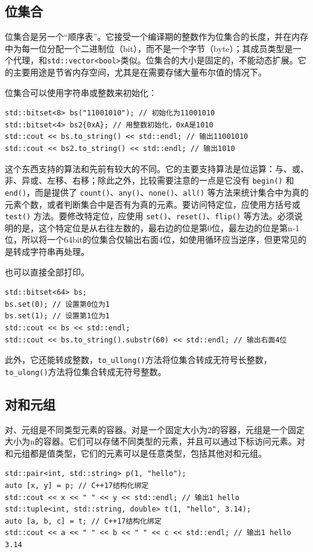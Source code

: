 \subsection{位集合}

位集合是另一个“顺序表”。它接受一个编译期的整数作为位集合的长度，并在内存中为每一位分配一个二进制位（bit），而不是一个字节（byte）；其成员类型是一个代理，和\verb|std::vector<bool>|类似。位集合的大小是固定的，不能动态扩展。它的主要用途是节省内存空间，尤其是在需要存储大量布尔值的情况下。

位集合可以使用字符串或整数来初始化：
\begin{verbatim}
std::bitset<8> bs("11001010"); // 初始化为11001010
std::bitset<4> bs2{0xA}; // 用整数初始化，0xA是1010
std::cout << bs.to_string() << std::endl; // 输出11001010
std::cout << bs2.to_string() << std::endl; // 输出1010
\end{verbatim}

这个东西支持的算法和先前有较大的不同。它的主要支持算法是位运算：与、或、非、异或、左移、右移；除此之外，比较需要注意的一点是它没有 \verb|begin()| 和 \verb|end()|，而是提供了 \verb|count()|、\verb|any()|、\verb|none()|、\verb|all()| 等方法来统计集合中为真的元素个数，或者判断集合中是否有为真的元素。要访问特定位，应使用方括号或 \verb|test()| 方法。要修改特定位，应使用 \verb|set()|、\verb|reset()|、\verb|flip()| 等方法。必须说明的是，这个特定位是从右往左数的，最右边的位是第0位，最左边的位是第n-1位，所以将一个64bit的位集合仅输出右面4位，如使用循环应当逆序，但更常见的是转成字符串再处理。

也可以直接全部打印。
\begin{verbatim}
std::bitset<64> bs;
bs.set(0); // 设置第0位为1
bs.set(1); // 设置第1位为1
std::cout << bs << std::endl; 
std::cout << bs.to_string().substr(60) << std::endl; // 输出右面4位
\end{verbatim}

此外，它还能转成整数，\verb|to_ullong()|方法将位集合转成无符号长整数，\verb|to_ulong()|方法将位集合转成无符号整数。

\subsection{对和元组}

对、元组是不同类型元素的容器。对是一个固定大小为2的容器，元组是一个固定大小为n的容器。它们可以存储不同类型的元素，并且可以通过下标访问元素。对和元组都是值类型，它们的元素可以是任意类型，包括其他对和元组。

\begin{verbatim}
std::pair<int, std::string> p(1, "hello");
auto [x, y] = p; // C++17结构化绑定
std::cout << x << " " << y << std::endl; // 输出1 hello
std::tuple<int, std::string, double> t(1, "hello", 3.14);
auto [a, b, c] = t; // C++17结构化绑定
std::cout << a << " " << b << " " << c << std::endl; // 输出1 hello 3.14
\end{verbatim}

